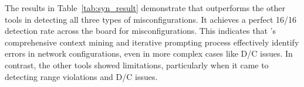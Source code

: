\begin{table}[thb]
\centering
{}
\caption{Configuration Update Verification Results.}
\label{tab:syn_result}
\end{table}

The results in Table~\ref{tab:syn_result} demonstrate that \sysname{} outperforms the other tools in detecting all three types of misconfigurations. It achieves a perfect 16/16 detection rate across the board for misconfigurations. This indicates that \sysname{}'s comprehensive context mining and iterative prompting process effectively identify errors in network configurations, even in more complex cases like D/C issues. In contrast, the other tools showed limitations, particularly when it came to detecting range violations and D/C issues.

